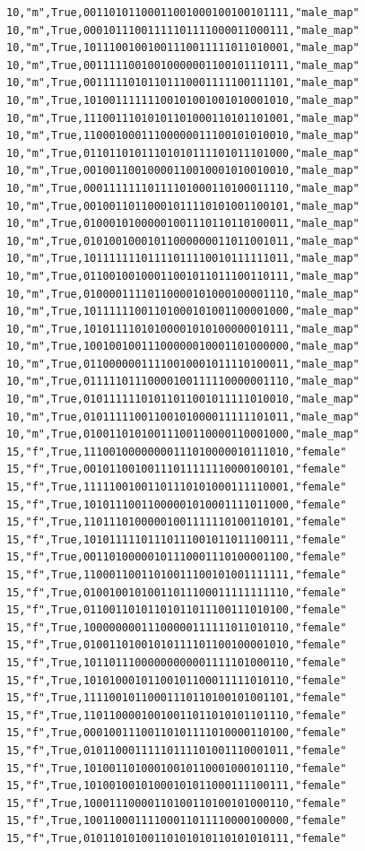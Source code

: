 \documentclass[authoryearcitations]{UoYCSproject}
\begin{document}
\begin{framed}
\begin{verbatim}
10,"m",True,00110101100011001000100100101111,"male_map"
10,"m",True,00010111001111101111000011000111,"male_map"
10,"m",True,10111001001001110011111011010001,"male_map"
10,"m",True,00111110010010000001100101110111,"male_map"
10,"m",True,00111110101101110001111100111101,"male_map"
10,"m",True,10100111111100101001001010001010,"male_map"
10,"m",True,11100111010101101000110101101001,"male_map"
10,"m",True,11000100011100000011100101010010,"male_map"
10,"m",True,01101101011101010111101011101000,"male_map"
10,"m",True,00100110010000110010001010010010,"male_map"
10,"m",True,00011111110111101000110100011110,"male_map"
10,"m",True,00100110110001011110101001100101,"male_map"
10,"m",True,01000101000001001110110110100011,"male_map"
10,"m",True,01010010001011000000011011001011,"male_map"
10,"m",True,10111111101111011110010111111011,"male_map"
10,"m",True,01100100100011001011011100110111,"male_map"
10,"m",True,01000011110110000101000100001110,"male_map"
10,"m",True,10111111001101000101001100001000,"male_map"
10,"m",True,10101111010100001010100000010111,"male_map"
10,"m",True,10010010011100000010001101000000,"male_map"
10,"m",True,01100000011110010001011110100011,"male_map"
10,"m",True,01111101110000100111110000001110,"male_map"
10,"m",True,01011111101011011001011111010010,"male_map"
10,"m",True,01011111001100101000011111101011,"male_map"
10,"m",True,01001101010011100110000110001000,"male_map"
15,"f",True,11100100000000111010000010111010,"female"
15,"f",True,00101100100111011111110000100101,"female"
15,"f",True,11111001001101110101000111110001,"female"
15,"f",True,10101110011000001010001111011000,"female"
15,"f",True,11011101000001001111110100110101,"female"
15,"f",True,10101111101110111001011011100111,"female"
15,"f",True,00110100000101110001110100001100,"female"
15,"f",True,11000110011010011100101001111111,"female"
15,"f",True,01001001010011011100011111111110,"female"
15,"f",True,01100110101101011011100111010100,"female"
15,"f",True,10000000011100000111111011010110,"female"
15,"f",True,01001101001010111101100100001010,"female"
15,"f",True,10110111000000000001111101000110,"female"
15,"f",True,10101000101100101100011111010110,"female"
15,"f",True,11110010110001110110100101001101,"female"
15,"f",True,11011000010010011011010101101110,"female"
15,"f",True,00010011100110101111010000110100,"female"
15,"f",True,01011000111110111101001110001011,"female"
15,"f",True,10100110100010010110001000101110,"female"
15,"f",True,10100100101000101011000111100111,"female"
15,"f",True,10001110000110100110100101000110,"female"
15,"f",True,10011000111100011011110000100000,"female"
15,"f",True,01011010100110101010110101010111,"female"

\end{verbatim}
\end{framed}
\end{document}
